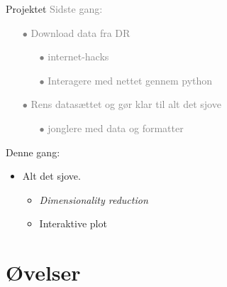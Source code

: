 \documentclass[10pt]{beamer}
\begin{document}
\begin{frame}[fragile]{Projektet}
\textcolor{gray}{Sidste gang:}
\begin{itemize}
  \item[\textcolor{gray}{$\bullet$}] \textcolor{gray}{Download data fra DR}
  \begin{itemize}
    \item[\textcolor{gray}{$\bullet$}] \textcolor{gray}{internet-hacks}
    \item[\textcolor{gray}{$\bullet$}] \textcolor{gray}{Interagere med nettet gennem python}
  \end{itemize}
  \item[\textcolor{gray}{$\bullet$}] \textcolor{gray}{Rens datasættet og gør klar til alt det sjove}
  \begin{itemize}
    \item[\textcolor{gray}{$\bullet$}] \textcolor{gray}{jonglere med data og formatter}
  \end{itemize}
\end{itemize}

Denne gang:
\begin{itemize}
  \item Alt det sjove.
  \begin{itemize}
    \item \textit{Dimensionality reduction}
    \item Interaktive plot
  \end{itemize}
\end{itemize}
\end{frame}





\section{Øvelser}
\end{document}
